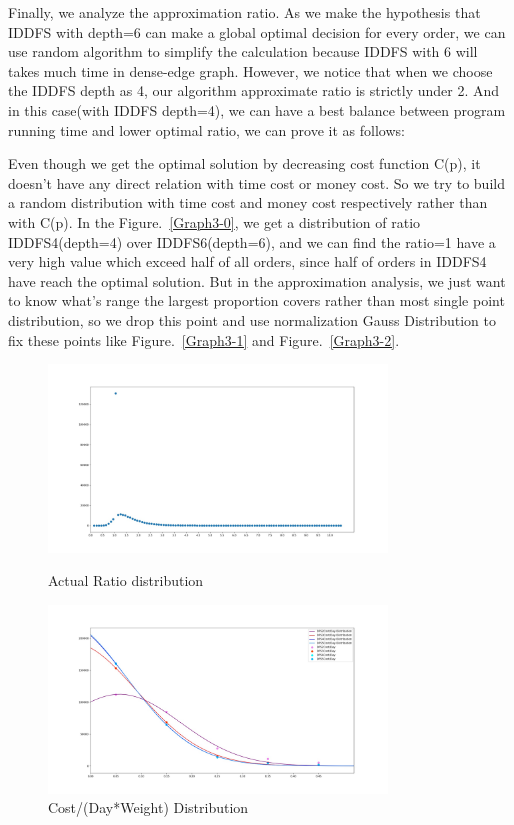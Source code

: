 \documentclass{llncs}
\begin{document}
Finally, we analyze the approximation ratio. As we make the hypothesis that IDDFS with depth=6 can make a global optimal decision for every order, we can use random algorithm to simplify the calculation because IDDFS with 6 will takes much time in dense-edge graph. However, we notice that when we choose the IDDFS depth as 4, our algorithm approximate ratio is strictly under 2. And in this case(with IDDFS depth=4), we can have a best balance between program running time and lower optimal ratio, we can prove it as follows:\par

Even though we get the optimal solution by decreasing cost function C(p), it doesn't have any direct relation with time cost or money cost. So we try to build a random distribution with time cost and money cost respectively rather than with C(p). In the Figure.~\ref{Graph3-0}, we get a distribution of ratio IDDFS4(depth=4) over IDDFS6(depth=6), and we can find the ratio=1 have a very high value which exceed half of all orders, since half of orders in IDDFS4 have reach the optimal solution. But in the approximation analysis, we just want to know what's range the largest proportion covers rather than most single point distribution, so we drop this point and use normalization Gauss Distribution to fix these points like Figure.~\ref{Graph3-1} and Figure.~\ref{Graph3-2}.

\begin{figure}[htbp]
\centering
\begin{minipage}[t]{0.48\textwidth}
\centering
\includegraphics[width = 9cm]{graph/dfs2dfs3_origin.jpg}
\caption{Actual Ratio distribution}
\label{Graph3-0}
\end{minipage}
\begin{minipage}[t]{0.48\textwidth}
\centering
\includegraphics[width = 9cm]{graph/costperday,.jpg}
\caption{Cost/(Day*Weight) Distribution}
\label{Graph3-0-0}
\end{minipage}
\end{figure}
\end{document}
